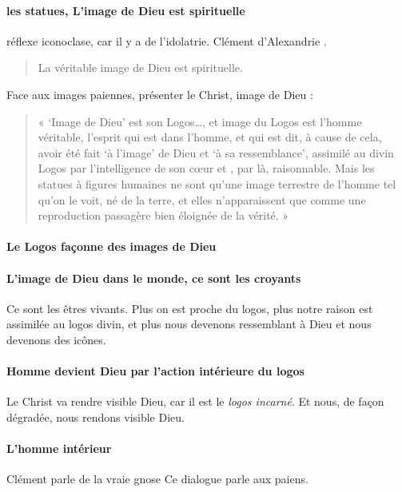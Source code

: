     \paragraph{les statues, L'image de Dieu est spirituelle} réflexe iconoclase, car il y a de l'idolatrie. Clément d'Alexandrie .
\begin{quote}
    La véritable image de Dieu est spirituelle.
\end{quote}    
Face aux images paiennes, présenter le Christ, image de Dieu : 
\begin{quote}
« `Image de Dieu' est son Logos\ldots, et image du Logos est l'homme
véritable, l'esprit qui est dans l'homme, et qui est dit, à cause de
cela, avoir été fait `à l'image' de Dieu et `à sa ressemblance',
assimilé au divin Logos par l'intelligence de son cœur et , par là,
raisonnable. Mais les statues à figures humaines ne sont qu'une image
terrestre de l'homme tel qu'on le voit, né de la terre, et elles
n'apparaissent que comme une reproduction passagère bien éloignée de la
vérité. »
\end{quote}
    
      
      \paragraph{Le Logos façonne des images de Dieu}
      
      \paragraph{L'image de Dieu dans le monde, ce sont les croyants} Ce sont les êtres vivants. Plus on est proche du logos, plus notre raison est assimilée au logos divin, et plus nous devenons ressemblant à Dieu et nous devenons des icônes.
      
      \paragraph{Homme devient Dieu par l'action intérieure du logos} Le Christ va rendre visible Dieu, car il est le \textit{logos incarné}. Et nous, de façon dégradée, nous rendons visible Dieu.
      
      \paragraph{L'homme intérieur}{Clément parle de la vraie gnose} Ce dialogue parle aux paiens. 

